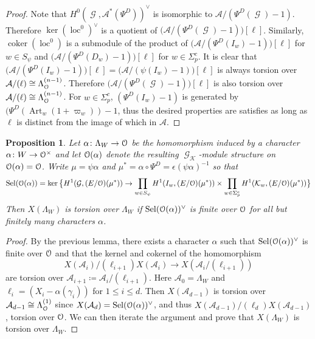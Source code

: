 \documentclass[leqno]{amsart}
\newtheorem{prop}[thm]{Proposition}
\theoremstyle{definition}
\theoremstyle{remark}
\newcommand{\eo}{\EuScript{O}}
\DeclareMathOperator{\coker}{coker}
\DeclareMathOperator{\Gal}{\mathcal{G}}
\DeclareMathOperator{\Art}{Art}
\newcommand{\K}{{\mathcal{K}}} %
\DeclareMathOperator{\loc}{loc}
\DeclareMathOperator{\Sel}{Sel}
\newcommand{\Lda}[1]{\Lambda^{(#1)}}
\begin{document}
\begin{proof}
Note that $H^0(\Gal,\mathcal{A}^*(\Psi^D))^\vee$
is isomorphic to $\mathcal{A}/(\Psi^D(\Gal)-1)$.
Therefore $\ker(\loc^0)^\vee$ is a quotient of
$\big(\mathcal{A}/(\Psi^D(\Gal)-1)\big)[\ell]$.
Similarly, $\coker(\loc^0)$ is a submodule of 
the product of 
$\big(\mathcal{A}/(\Psi^D(I_w)-1)\big)[\ell]$
for $w\in S_\psi$ and
$\big(\mathcal{A}/(\Psi^D(D_w)-1)\big)[\ell]$
for $w\in \Sigma_p^c$.
It is clear that 
$\big(\mathcal{A}/(\Psi^D(I_w)-1)\big)[\ell]=
\big(\mathcal{A}/(\psi(I_w)-1)\big)[\ell]$
is always torsion over $\mathcal{A}/(\ell)\cong \Lda{n-1}_{\eo}$.
Therefore $\big(\mathcal{A}/(\Psi^D(\Gal)-1)\big)[\ell]$
is also torsion over $\mathcal{A}/(\ell)\cong \Lda{n-1}_{\eo}$.
For $w\in\Sigma_p^c$,
$(\Psi^D(I_w)-1)$ is generated by
$(\Psi^D(\Art_w(1+\varpi_w))-1$,
thus the desired properties are satisfies as long as 
$\ell$ is distinct from the image of which in $\mathcal{A}$.
    
\end{proof}

\begin{prop}\label{prop:tor_crit}
Let $\alpha\colon \Lambda_W\to \eo$
be the homomorphism induced by a
character $\alpha\colon W\to \eo^\times$
and let $\eo(\alpha)$ denote 
the resulting $\Gal_\K$-module structure
on $\eo(\alpha)=\eo$. 
Write $\mu=\psi\alpha$ and 
$\mu^*=\alpha\circ\Psi^D=\epsilon(\psi\alpha)^{-1}$ so that
\begin{equation}\label{eq:Sel_base}
\Sel(\eo(\alpha))=
\ker\big\{
H^1(\Gal, (E/\eo)(\mu^*))\to
\prod_{w\in S_\psi}
H^1(I_w,(E/\eo)(\mu^*))\times 
\prod_{w\in \Sigma_p^c}
H^1(\K_w,(E/\eo)(\mu^*))
\big\}
\end{equation}
Then $X(\Lambda_W)$
is torsion over $\Lambda_W$
if $\Sel(\eo(\alpha))^\vee$ is finite over $\eo$
for all but finitely many characters $\alpha$.
\end{prop}

\begin{proof}
By the previous lemma, there exists a character $\alpha$
such that  $\Sel(\eo(\alpha))^\vee$ is finite over $\eo$
and that the kernel and cokernel of the homomorphism
\[
    X(\mathcal{A}_i)/(\ell_{i+1})X(\mathcal{A}_{i})
    \to X(\mathcal{A}_i/(\ell_{i+1}))
\]
are torsion over $\mathcal{A}_{i+1}\coloneqq \mathcal{A}_i/(\ell_{i+1})$.
Here $\mathcal{A}_0=\Lambda_W$
and $\ell_i=(X_i-\alpha(\gamma_i))$ for $1\leq i\leq d$.
Then $X(\mathcal{A}_{d-1})$ is torsion over 
$\mathcal{A}_{d-1}\cong \Lda{1}_{\eo}$ since
$X(\mathcal{A}_d)=\Sel(\eo(\alpha))^\vee$,
and thus $X(\mathcal{A}_{d-1})/(\ell_{d})X(\mathcal{A}_{d-1})$,
torsion over $\eo$.
We can then iterate the argument and prove that 
$X(\Lambda_W)$ is torsion over $\Lambda_W$.

\end{proof}
\end{document}
